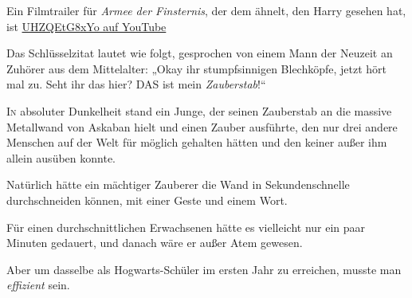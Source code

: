 
\begin{chapterOpeningAuthorNote}
Ein Filmtrailer für \emph{Armee der Finsternis}, der dem ähnelt, den Harry gesehen hat, ist \href{https://www.youtube.com/watch?v=UHZQEtG8xYo}{UHZQEtG8xYo auf YouTube}

Das Schlüsselzitat lautet wie folgt, gesprochen von einem Mann der Neuzeit an Zuhörer aus dem Mittelalter:
„Okay ihr stumpfsinnigen Blechköpfe, jetzt hört mal zu. Seht ihr das hier? DAS ist mein \emph{Zauberstab}!“%
\end{chapterOpeningAuthorNote}

\lettrine{I}{n} absoluter Dunkelheit stand ein Junge, der seinen Zauberstab an die massive Metallwand von Askaban hielt und einen Zauber ausführte, den nur drei andere Menschen auf der Welt für möglich gehalten hätten und den keiner außer ihm allein ausüben konnte.

Natürlich hätte ein mächtiger Zauberer die Wand in Sekundenschnelle durchschneiden können, mit einer Geste und einem Wort.

Für einen durchschnittlichen Erwachsenen hätte es vielleicht nur ein paar Minuten gedauert, und danach wäre er außer Atem gewesen.

Aber um dasselbe als Hogwarts-Schüler im ersten Jahr zu erreichen, musste man \emph{effizient} sein.

